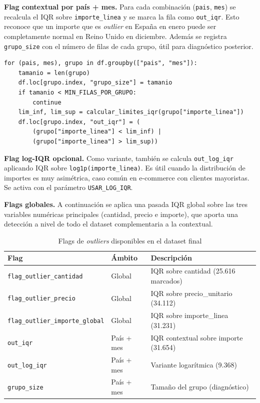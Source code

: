 \documentclass[11pt,a4paper]{article}
\begin{document}
\textbf{Flag contextual por país + mes.} Para cada combinación (\texttt{pais}, \texttt{mes}) se recalcula el IQR sobre \texttt{importe\_linea} y se marca la fila como \texttt{out\_iqr}. Esto reconoce que un importe que es \textit{outlier} en España en enero puede ser completamente normal en Reino Unido en diciembre. Además se registra \texttt{grupo\_size} con el número de filas de cada grupo, útil para diagnóstico posterior.

\begin{lstlisting}
for (pais, mes), grupo in df.groupby(["pais", "mes"]):
    tamanio = len(grupo)
    df.loc[grupo.index, "grupo_size"] = tamanio
    if tamanio < MIN_FILAS_POR_GRUPO:
        continue
    lim_inf, lim_sup = calcular_limites_iqr(grupo["importe_linea"])
    df.loc[grupo.index, "out_iqr"] = (
        (grupo["importe_linea"] < lim_inf) |
        (grupo["importe_linea"] > lim_sup))
\end{lstlisting}

\textbf{Flag log-IQR opcional.} Como variante, también se calcula \texttt{out\_log\_iqr} aplicando IQR sobre \texttt{log1p(importe\_linea)}. Es útil cuando la distribución de importes es muy asimétrica, caso común en e-commerce con clientes mayoristas. Se activa con el parámetro \texttt{USAR\_LOG\_IQR}.

\textbf{Flags globales.} A continuación se aplica una pasada IQR global sobre las tres variables numéricas principales (cantidad, precio e importe), que aporta una detección a nivel de todo el dataset complementaria a la contextual.

\begin{table}[h]
\centering
\caption{Flags de \textit{outliers} disponibles en el dataset final}
\begin{tabular}{lll}
\toprule
\textbf{Flag} & \textbf{Ámbito} & \textbf{Descripción} \\
\midrule
\texttt{flag\_outlier\_cantidad} & Global & IQR sobre cantidad (25.616 marcados) \\
\texttt{flag\_outlier\_precio} & Global & IQR sobre precio\_unitario (34.112) \\
\texttt{flag\_outlier\_importe\_global} & Global & IQR sobre importe\_linea (31.231) \\
\texttt{out\_iqr} & País + mes & IQR contextual sobre importe (31.654) \\
\texttt{out\_log\_iqr} & País + mes & Variante logarítmica (9.368) \\
\texttt{grupo\_size} & País + mes & Tamaño del grupo (diagnóstico) \\
\bottomrule
\end{tabular}
\end{table}
\end{document}
